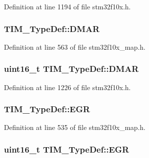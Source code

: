 Definition at line 1194 of file stm32f10x.\+h.

\subsubsection[{\texorpdfstring{D\+M\+AR}{DMAR}}]{ T\+I\+M\+\_\+\+Type\+Def\+::\+D\+M\+AR}\hypertarget{struct_t_i_m___type_def_a36f9674cb0037facb1188b4e5e1bd4b6}{}\label{struct_t_i_m___type_def_a36f9674cb0037facb1188b4e5e1bd4b6}


Definition at line 563 of file stm32f10x\+\_\+map.\+h.

\subsubsection[{\texorpdfstring{D\+M\+AR}{DMAR}}]{ {\bf uint16\+\_\+t} T\+I\+M\+\_\+\+Type\+Def\+::\+D\+M\+AR}\hypertarget{struct_t_i_m___type_def_a4e0fbb52e6dd4bdabcb3f3b2f4bae40c}{}\label{struct_t_i_m___type_def_a4e0fbb52e6dd4bdabcb3f3b2f4bae40c}


Definition at line 1226 of file stm32f10x.\+h.

\subsubsection[{\texorpdfstring{E\+GR}{EGR}}]{ T\+I\+M\+\_\+\+Type\+Def\+::\+E\+GR}\hypertarget{struct_t_i_m___type_def_ade5124b97ae662bfff56575d2d291e65}{}\label{struct_t_i_m___type_def_ade5124b97ae662bfff56575d2d291e65}


Definition at line 535 of file stm32f10x\+\_\+map.\+h.

\subsubsection[{\texorpdfstring{E\+GR}{EGR}}]{ {\bf uint16\+\_\+t} T\+I\+M\+\_\+\+Type\+Def\+::\+E\+GR}\hypertarget{struct_t_i_m___type_def_a724fd21b7131fb9ac78c1b661dee3a8d}{}\label{struct_t_i_m___type_def_a724fd21b7131fb9ac78c1b661dee3a8d}


